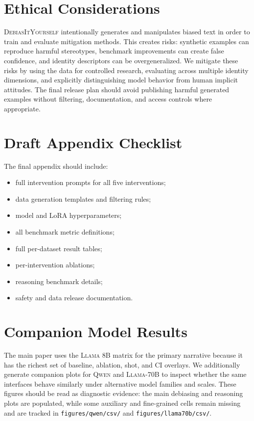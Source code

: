 \documentclass[11pt]{article}
\newcommand{\diy}{\textsc{DebiasItYourself}}
\newcommand{\llama}{\textsc{Llama}}
\newcommand{\qwen}{\textsc{Qwen}}
\begin{document}
\section*{Ethical Considerations}
\label{sec:ethical}

\diy{} intentionally generates and manipulates biased text in order to train and evaluate mitigation methods. This creates risks: synthetic examples can reproduce harmful stereotypes, benchmark improvements can create false confidence, and identity descriptors can be overgeneralized. We mitigate these risks by using the data for controlled research, evaluating across multiple identity dimensions, and explicitly distinguishing model behavior from human implicit attitudes. The final release plan should avoid publishing harmful generated examples without filtering, documentation, and access controls where appropriate.



\appendix
\clearpage
\section{Draft Appendix Checklist}
\label{sec:appendix-checklist}

The final appendix should include:
\begin{itemize}[leftmargin=1.4em,itemsep=1pt,topsep=2pt]
    \item full intervention prompts for all five interventions;
    \item data generation templates and filtering rules;
    \item model and LoRA hyperparameters;
    \item all benchmark metric definitions;
    \item full per-dataset result tables;
    \item per-intervention ablations;
    \item reasoning benchmark details;
    \item safety and data release documentation.
\end{itemize}

\section{Companion Model Results}
\label{sec:appendix-model-results}

The main paper uses the \llama{} 8B matrix for the primary narrative because it has the richest set of baseline, ablation, shot, and CI overlays. We additionally generate companion plots for \qwen{} and \llama{}-70B to inspect whether the same interfaces behave similarly under alternative model families and scales. These figures should be read as diagnostic evidence: the main debiasing and reasoning plots are populated, while some auxiliary and fine-grained cells remain missing and are tracked in \texttt{figures/qwen/csv/} and \texttt{figures/llama70b/csv/}.
\end{document}
